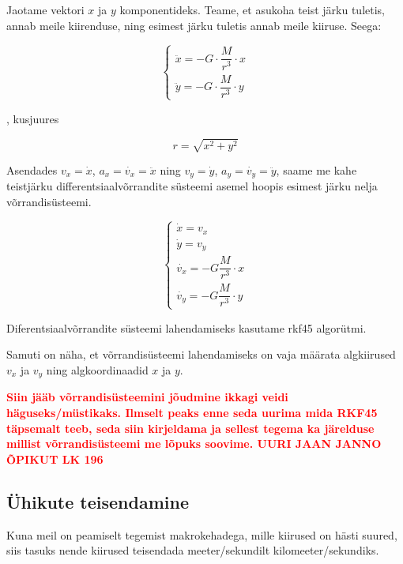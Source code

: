 \begin{flushleft}
Jaotame vektori $x$ ja $y$ komponentideks. Teame, et asukoha teist järku tuletis, annab meile kiirenduse, ning esimest järku tuletis annab meile kiiruse. Seega:



\begin{equation}
\label{eq6}
\begin{cases}
\ddot{x}=-G \cdot \dfrac{M}{r^{3}}\cdot x\\
\ddot{y}=-G \cdot \dfrac{M}{r^{3}}\cdot y
\end{cases}
\end{equation}

, kusjuures

\begin{equation}
\label{eq7}
r= \sqrt{x^{2}+y^{2}}
\end{equation}

Asendades $v_{x}=\dot{x}$, $a_{x}=\dot{v_{x}}=\ddot{x}$ ning $v_{y}=\dot{y}$, $a_{y}=\dot{v_{y}}=\ddot{y}$, saame me kahe teistjärku differentsiaalvõrrandite süsteemi asemel hoopis esimest järku nelja võrrandisüsteemi.


\begin{equation}
\label{eq8}
\begin{cases}
\dot{x}=v_{x}\\
\dot{y}=v_{y}\\
\dot{v_{x}}=-G\dfrac{M}{r^{3}}\cdot x\\
\dot{v_{y}}=-G\dfrac{M}{r^{3}}\cdot y

\end{cases}
\end{equation}

Diferentsiaalvõrrandite süsteemi lahendamiseks kasutame rkf45 algorütmi.

Samuti on näha, et võrrandisüsteemi lahendamiseks on vaja määrata algkiirused $v_{x}$ ja $v_{y}$ ning algkoordinaadid $x$ ja $y$.

\textbf{\textcolor{red}{Siin jääb võrrandisüsteemini jõudmine ikkagi veidi häguseks/müstikaks. Ilmselt peaks enne seda uurima mida RKF45 täpsemalt teeb, seda siin kirjeldama ja sellest tegema ka järelduse millist võrrandisüsteemi me lõpuks soovime. UURI JAAN JANNO ÕPIKUT LK 196}}

\subsection{Ühikute teisendamine}

Kuna meil on peamiselt tegemist makrokehadega, mille kiirused on hästi suured, siis tasuks nende kiirused teisendada meeter/sekundilt kilomeeter/sekundiks.


\end{flushleft}
